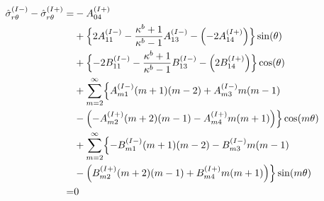 \begin{align}
	\hat{\sigma}_{r\theta}^{(I-)}-\hat{\sigma}_{r\theta}^{(I+)} =
	&-A_{04}^{(I+)}
	\nonumber
	\\
	&+\Bigl\{2A_{11}^{(I-)}-\frac{\kappa^{b}+1}{\kappa^{b}-1}A_{13}^{(I-)}
	-\Bigl(-2A_{14}^{(I+)}\Bigr)\Bigr\}\sin(\theta)
	\nonumber
	\\
	&+\Bigl\{-2B_{11}^{(I-)}-\frac{\kappa^{b}+1}{\kappa^{b}-1}B_{13}^{(I-)}
	-\Bigl(2B_{14}^{(I+)}\Bigr)\Bigr\}\cos(\theta)
	\nonumber
	\\
	&+\sum_{m=2}^{\infty}\Bigl\{
 	A_{m1}^{(I-)}(m+1)(m-2)+A_{m3}^{(I-)}m(m-1)
	\nonumber
	\\
	&-\Bigl(-A_{m2}^{(I+)}(m+2)(m-1)-A_{m4}^{(I+)}m(m+1)\Bigr)
	\Bigr\}\cos(m\theta)
	\nonumber
	\\
	&+\sum_{m=2}^{\infty}\Bigl\{
	-B_{m1}^{(I-)}(m+1)(m-2)-B_{m3}^{(I-)}m(m-1)
	\nonumber
	\\
	&-\Bigl(B_{m2}^{(I+)}(m+2)(m-1)+B_{m4}^{(I+)}m(m+1)\Bigr)
	\Bigr\}\sin(m\theta)
	\nonumber
	\\
	=&0
	\label{eq:SigmaRTh1eq}
\end{align}

\newpage